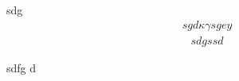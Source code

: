 sdg
\begin{align}
  sgd
  \kappa
  \gamma
  sgey
\end{align}
\begin{eqnarray*}
sdgssd  
\end{eqnarray*}

sdfg
d
